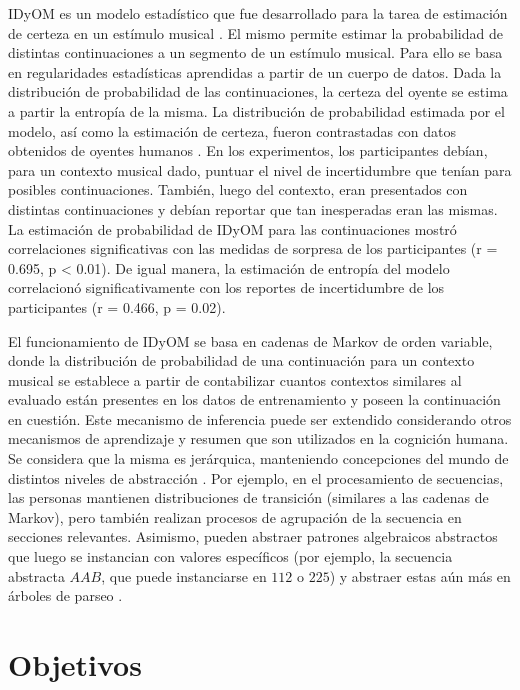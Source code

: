 \documentclass[a4paper,11pt]{article}
\begin{document}
IDyOM es un modelo estadístico que fue desarrollado para la tarea de estimación
de certeza en un estímulo musical \cite{pearce2005construction}. El mismo
permite estimar la probabilidad de distintas continuaciones a un segmento de un
estímulo musical. Para ello se basa en regularidades estadísticas aprendidas a
partir de un cuerpo de datos. Dada la distribución de probabilidad de las
continuaciones, la certeza del oyente se estima a partir la entropía de la
misma. La distribución de probabilidad estimada por el modelo, así como la
estimación de certeza, fueron contrastadas con datos obtenidos de oyentes
humanos \cite{hansen2014uncertainty}. En los experimentos, los
participantes debían, para un contexto musical dado, puntuar el nivel de
incertidumbre que tenían para posibles continuaciones. También, luego del
contexto, eran presentados con distintas continuaciones y debían reportar que
tan inesperadas eran las mismas. La estimación de probabilidad de IDyOM para
las continuaciones mostró correlaciones significativas con las medidas de
sorpresa de los participantes (r = 0.695, p < 0.01). De igual manera, la
estimación de entropía del modelo correlacionó significativamente con los
reportes de incertidumbre de los participantes (r = 0.466, p = 0.02).

El funcionamiento de IDyOM se basa en cadenas de Markov de orden variable,
donde la distribución de probabilidad de una continuación para un contexto
musical se establece a partir de contabilizar cuantos contextos similares al
evaluado están presentes en los datos de entrenamiento y poseen la continuación
en cuestión. Este mecanismo de inferencia puede ser extendido considerando
otros mecanismos de aprendizaje y resumen que son utilizados en la cognición
humana. Se considera que la misma es jerárquica, manteniendo concepciones del
mundo de distintos niveles de abstracción \cite{friston2010free}. Por ejemplo,
en el procesamiento de secuencias, las personas mantienen distribuciones de
transición (similares a las cadenas de Markov), pero también realizan procesos
de agrupación de la secuencia en secciones relevantes. Asimismo, pueden
abstraer patrones algebraicos abstractos que luego se instancian con valores
específicos (por ejemplo, la secuencia abstracta $AAB$, que puede instanciarse
en $112$ o $225$) y abstraer estas aún más en árboles de parseo
\cite{dehaene2015neural}.

\section*{Objetivos} 
\end{document}
